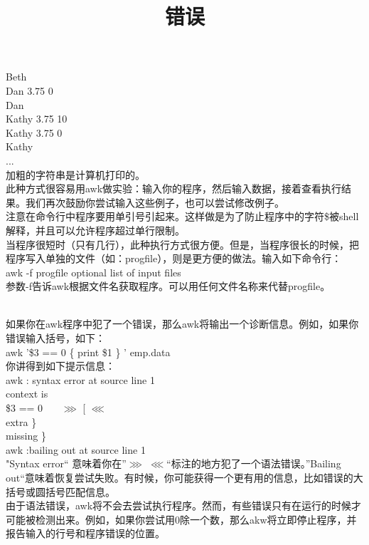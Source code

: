 \documentclass[10pt,fancyhdr,UTF-8]{ctexart}
\begin{document}
Beth  \\
Dan       3.75      0 \\
Dan   \\ 
Kathy     3.75      10 \\
Kathy     3.75      0 \\
Kathy \\
...   \\
加粗的字符串是计算机打印的。 \\
此种方式很容易用awk做实验：输入你的程序，然后输入数据，接着查看执行结果。我们再次鼓励你尝试输入这些例子，也可以尝试修改例子。 \\
注意在命令行中程序要用单引号引起来。这样做是为了防止程序中的字符\$被shell解释，并且可以允许程序超过单行限制。 \\
当程序很短时（只有几行），此种执行方式很方便。但是，当程序很长的时候，把程序写入单独的文件（如：progfile），则是更方便的做法。输入如下命令行： \\
awk  -f  progfile  optional  list   of  input  files \\
参数-f告诉awk根据文件名获取程序。可以用任何文件名称来代替progfile。 \\
\indent\title{\textbf{错误}} \\
如果你在awk程序中犯了一个错误，那么awk将输出一个诊断信息。例如，如果你错误输入括号，如下：\\
awk   '\$3 == 0 \{  print \$1 \} '  emp.data \\
你讲得到如下提示信息： \\
awk : syntax  error  at  source  line 1 \\
   context   is \\
   \$3 == 0 \ \ \ \emph{$\ggg$} [  \emph{$\lll$} \\
      extra  \}  \\
	  missing \} \\
   awk :bailing  out at source  line 1 \\
   \indent"Syntax error“ 意味着你在”\emph{$\ggg$} \emph{$\lll$}“标注的地方犯了一个语法错误。”Bailing out“意味着恢复尝试失败。有时候，你可能获得一个更有用的信息，比如错误的大括号或圆括号匹配信息。 \\
\indent 由于语法错误，awk将不会去尝试执行程序。然而，有些错误只有在运行的时候才可能被检测出来。例如，如果你尝试用0除一个数，那么akw将立即停止程序，并报告输入的行号和程序错误的位置。 \\
\end{document}
